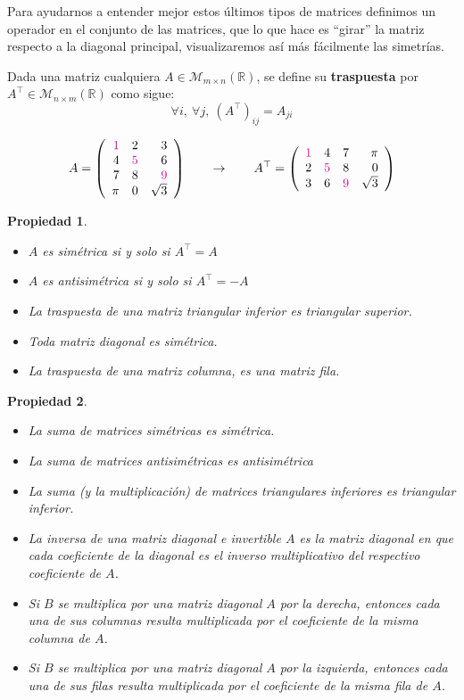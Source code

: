 \documentclass[12pt]{book}
\newtheorem{prop}{Propiedad}
\def\pq{\vspace{0.5cm}}
\def\R{\mathbb{R}}
\begin{document}
 

Para ayudarnos a entender mejor estos últimos tipos de matrices definimos un operador en el conjunto de las matrices, que lo que hace es ``girar'' la matriz respecto a la diagonal principal, visualizaremos así más fácilmente las simetrías.

Dada una matriz cualquiera $A\in\mathcal{M}_{m\times n}(\R)$, se define su {\bf traspuesta} por $A^\top\in\mathcal{M}_{n\times m}(\R)$ como sigue:
$$ \forall i,\ \forall j,\ (A^\top)_{ij}=A_{ji}$$

$$A=\left(\begin{array}{rrr}\color{magenta}{1}& 2&3\\ 4& \color{magenta}{5}&6\\7&8&\color{magenta}{9}\\ \pi&0&\sqrt{3}\end{array}\right)\qquad\rightarrow\qquad
A^\top=\left(\begin{array}{rrrr}\color{magenta}{1}& 4&7&\pi\\ 2& \color{magenta}{5}& 8&0\\ 3&6&\color{magenta}{9}&\sqrt{3}\end{array}\right)$$

 \pq

\begin{prop}
\begin{itemize}
\item $A$ es simétrica si y solo si $A^\top=A$
\item $A$ es antisimétrica si y solo si $A^\top=-A$
\item La traspuesta de una matriz triangular inferior es triangular superior.
\item Toda matriz diagonal es simétrica.
\item La traspuesta de una matriz columna, es una matriz fila.
\end{itemize}
\end{prop}

\pq

\begin{prop}
  \begin{itemize}
  \item La suma de matrices simétricas es simétrica.
  \item La suma de matrices antisimétricas es antisimétrica
  \item La suma (y la multiplicación) de matrices triangulares inferiores es triangular inferior.
  \item La inversa de una matriz diagonal e invertible $A$ es la matriz diagonal en que cada coeficiente de la diagonal es el inverso multiplicativo del respectivo coeficiente de $A$.
  \item Si $B$ se multiplica por una matriz diagonal $A$ por la derecha, entonces cada una de sus columnas resulta multiplicada por el coeficiente de la misma columna de $A$.
  \item Si $B$ se multiplica por una matriz diagonal $A$ por la izquierda, entonces cada una de sus filas resulta multiplicada por el coeficiente de la misma fila de $A$.
  \end{itemize}
\end{prop}
\end{document}
